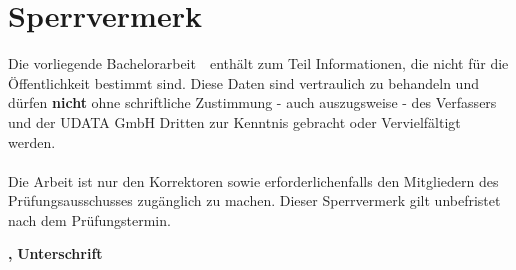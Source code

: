 \chapter*{Sperrvermerk}
Die vorliegende Bachelorarbeit\
\textbf{\large \glqq\trtitleDE\grqq{}}\ 
enthält zum Teil Informationen, die nicht für die Öffentlichkeit bestimmt sind. Diese Daten sind vertraulich zu behandeln und d\"urfen \textbf{nicht} ohne schriftliche Zustimmung - auch auszugsweise - des Verfassers und der UDATA GmbH Dritten zur Kenntnis gebracht oder Vervielfältigt  werden.
\\\\Die Arbeit ist nur den Korrektoren sowie erforderlichenfalls den Mitgliedern des
Prüfungsausschusses zugänglich zu machen. Dieser Sperrvermerk gilt unbefristet nach dem Pr\"ufungstermin.
\vspace{3cm}

\textbf{\trort, \trdate} \hfill \textbf{Unterschrift} \hspace{2cm}